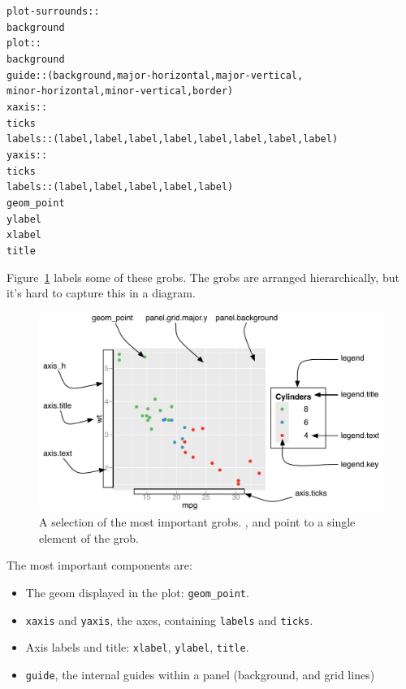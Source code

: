 \begin{alltt}
plot-surrounds::
 background
 plot::
  background
  guide:: (background, major-horizontal, major-vertical, 
           minor-horizontal, minor-vertical, border)
  xaxis::
   ticks
   labels:: (label, label, label, label, label, label, label, label)
  yaxis::
   ticks
   labels:: (label, label, label, label, label)
  geom_point
 ylabel
 xlabel
 title
\end{alltt}

Figure~\ref{fig:grobs} labels some of these grobs.  The grobs are arranged hierarchically, but it's hard to capture this in a diagram.

\begin{figure}[htbp]
  \centering
    \includegraphics[width=\textwidth]{grid-grobs}
  \caption{A selection of the most important grobs.  ,  and  point to a single element of the grob.}
  \label{fig:grobs}
\end{figure}

The most important components are:

\begin{itemize}
  \item The geom displayed in the plot: {\tt geom\_point}.

  \item {\tt xaxis} and {\tt yaxis}, the axes, containing {\tt labels} and {\tt ticks}.

	\item Axis labels and title: {\tt xlabel}, {\tt ylabel}, {\tt title}.

  \item {\tt guide}, the internal guides within a panel (background, and grid lines)

\end{itemize}

